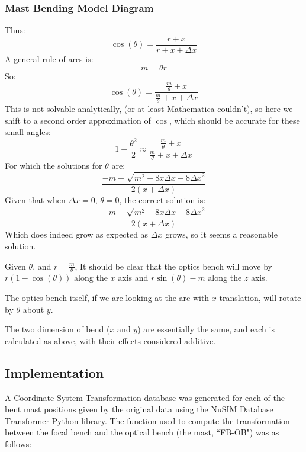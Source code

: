 \subsubsection{Mast Bending Model Diagram }
\begin{center}
\leavevmode
\end{center}


 Thus:
\[
\cos \left( \theta \right) = \frac{r+x}{r+x+\Delta x}
\]
A general rule of arcs is:
\[
m = \theta r
\]
So:
\[
\cos \left( \theta \right) = \frac{\frac{m}{\theta}+x}{\frac{m}{\theta}+x+\Delta x}
\]
This is not solvable analytically, (or at least Mathematica couldn't), so here we shift to a second order approximation of $\cos$, which should be accurate for these small angles:
\[
1-\frac{\theta^2}{2} \approx \frac{\frac{m}{\theta}+x}{\frac{m}{\theta}+x+\Delta x}
\]
For which the solutions for $\theta$ are:
\[
\frac{-m \pm \sqrt{m^2+8x\Delta x + 8{\Delta x}^2}}{2 \left( x + \Delta x \right)}
\]
Given that when $\Delta x = 0$, $\theta = 0$, the correct solution is:
\[
\frac{-m + \sqrt{m^2+8x\Delta x + 8{\Delta x}^2}}{2 \left( x + \Delta x \right)}
\]
Which does indeed grow as expected as $\Delta x$ grows, so it seems a reasonable solution. 


Given $\theta$, and $r = \frac{m}{\theta}$, It should be clear that the optics bench will move by $r\left(1-\cos\left(\theta\right)\right)$ along the $x$ axis and $r\sin\left(\theta\right)-m$ along the $z$ axis. 

The optics bench itself, if we are looking at the arc with $x$ translation, will rotate by $\theta$ about $y$. 

The two dimension of bend ($x$ and $y$) are essentially the same, and each is calculated as above, with their effects considered additive. 

\subsection{Implementation}
A Coordinate System Transformation database was generated for each of the bent mast positions given by the original data using the NuSIM Database Transformer Python library. The function used to compute the transformation between the focal bench and the optical bench (the mast, ``FB-OB") was as follows:

